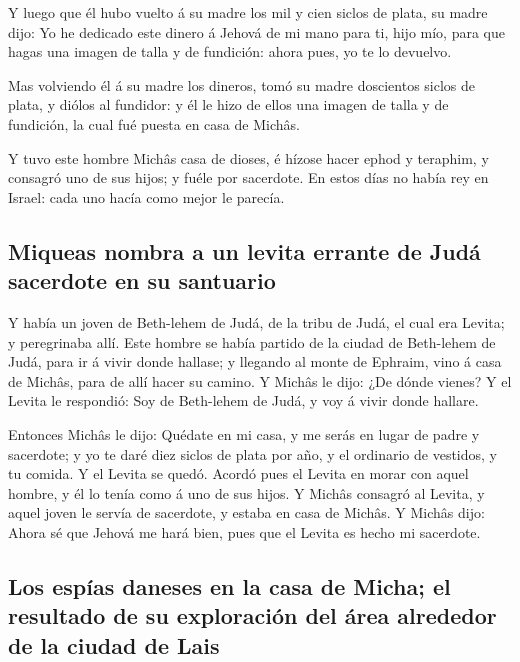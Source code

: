  Y luego que él hubo vuelto á su madre los mil y cien
siclos de plata, su madre dijo: Yo he dedicado este dinero á Jehová de
mi mano para ti, hijo mío, para que hagas una imagen de talla y de
fundición: ahora pues, yo te lo devuelvo.

 Mas volviendo él á su madre los dineros, tomó su madre
doscientos siclos de plata, y diólos al fundidor: y él le hizo de ellos
una imagen de talla y de fundición, la cual fué puesta en casa de
Michâs.

 Y tuvo este hombre Michâs casa de dioses, é hízose hacer
ephod y teraphim, y consagró uno de sus hijos; y fuéle por sacerdote.
 En estos días no había rey en Israel: cada uno hacía como
mejor le parecía.

\hypertarget{miqueas-nombra-a-un-levita-errante-de-juduxe1-sacerdote-en-su-santuario}{%
\subsection{Miqueas nombra a un levita errante de Judá sacerdote en su
santuario}\label{miqueas-nombra-a-un-levita-errante-de-juduxe1-sacerdote-en-su-santuario}}

 Y había un joven de Beth-lehem de Judá, de la tribu de
Judá, el cual era Levita; y peregrinaba allí.  Este hombre
se había partido de la ciudad de Beth-lehem de Judá, para ir á vivir
donde hallase; y llegando al monte de Ephraim, vino á casa de Michâs,
para de allí hacer su camino.  Y Michâs le dijo: ¿De dónde
vienes? Y el Levita le respondió: Soy de Beth-lehem de Judá, y voy á
vivir donde hallare.

 Entonces Michâs le dijo: Quédate en mi casa, y me serás
en lugar de padre y sacerdote; y yo te daré diez siclos de plata por
año, y el ordinario de vestidos, y tu comida. Y el Levita se quedó.
 Acordó pues el Levita en morar con aquel hombre, y él lo
tenía como á uno de sus hijos.  Y Michâs consagró al
Levita, y aquel joven le servía de sacerdote, y estaba en casa de
Michâs.  Y Michâs dijo: Ahora sé que Jehová me hará bien,
pues que el Levita es hecho mi sacerdote.

\hypertarget{los-espuxedas-daneses-en-la-casa-de-micha-el-resultado-de-su-exploraciuxf3n-del-uxe1rea-alrededor-de-la-ciudad-de-lais}{%
\subsection{Los espías daneses en la casa de Micha; el resultado de su
exploración del área alrededor de la ciudad de
Lais}\label{los-espuxedas-daneses-en-la-casa-de-micha-el-resultado-de-su-exploraciuxf3n-del-uxe1rea-alrededor-de-la-ciudad-de-lais}}

